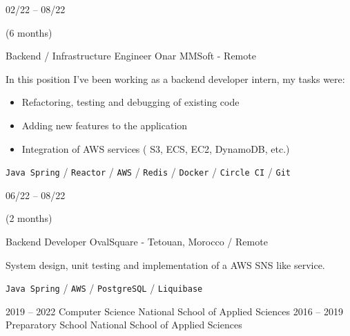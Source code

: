 \documentclass[10pt]{developercv} %
\begin{document}
\begin{entrylist}
	\entry
		{02/22 -- 08/22

            (6 months)}
		{Backend / Infrastructure Engineer}
		{Onar MMSoft - Remote}
	    {In this position I've been working as a backend developer intern,
	        my tasks were:

            \begin{itemize}
                \item Refactoring, testing and debugging of existing code
                \item Adding new features to the application
                \item Integration of AWS services ( S3, ECS, EC2, DynamoDB, etc.)
            \end{itemize}

            \texttt{Java Spring} /
            \texttt{Reactor} /
            \texttt{AWS} /
            \texttt{Redis} /
            \texttt{Docker} /
            \texttt{Circle CI} /
            \texttt{Git} 
        }
	\entry
		{06/22 -- 08/22
		    
		    (2 months)}
		{Backend Developer}
		{OvalSquare - Tetouan, Morocco / Remote}
		{System design, unit testing and implementation of a AWS SNS like service.

            \texttt {Java Spring} /
            \texttt {AWS} /
            \texttt {PostgreSQL} /
            \texttt {Liquibase}
		}
\end{entrylist}



\begin{entrylist}
	\entry
		{2019 -- 2022}
		{Computer Science}
		{National School of Applied Sciences}
        {}
	\entry
		{2016 -- 2019}
		{Preparatory School}
		{National School of Applied Sciences}
        {}
\end{entrylist}



\end{document}
